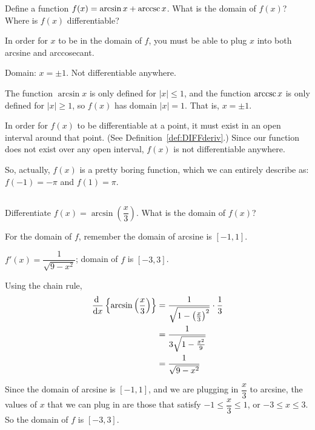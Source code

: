 \begin{question}
Define a function $f(x)=\arcsin x + \mathop{\mathrm{arccsc}} x$. What is the domain of $f(x)$? Where is $f(x)$ differentiable?
\end{question}
\begin{hint}
In order for $x$ to be in the domain of $f$, you must be able to plug $x$ into both arcsine and arccosecant.
\end{hint}
\begin{answer}
Domain: $x=\pm 1$. Not differentiable anywhere.
\end{answer}
\begin{solution}
The function $\arcsin x$ is only defined for $|x| \leq 1$, and the function $\mathop{\mathrm{arccsc}} x$ is only defined for $|x| \geq 1$, so $f(x)$ has domain $|x|=1$. That is, $x=\pm1$.

In order for $f(x)$ to be differentiable at a point, it must exist in an open interval around that point. (See Definition~\ref*{def:DIFFderiv}.) Since our function does not exist over any open interval, $f(x)$ is not differentiable anywhere.

So, actually, $f(x)$ is a pretty boring function, which we can entirely describe as: $f(-1)=-\pi$ and $f(1)=\pi$.
\end{solution}




\subsection*{\Procedural}





\begin{question}
Differentiate $f(x)=\arcsin\left(\dfrac{x}{3}\right)$. What is the domain of $f(x)$?
\end{question}
\begin{hint}
For the domain of $f$, remember the domain of arcsine is $[-1,1]$.
\end{hint}
\begin{answer}
$f'(x)=\dfrac{1}{\sqrt{9-x^2}}$; domain of $f$ is $[-3,3]$.
\end{answer}
\begin{solution}
Using the chain rule,
\begin{align*}
\diff{}{x}\left\{\arcsin\left(\frac{x}{3}\right)\right\}&=\frac{1}{\sqrt{1-\left(\frac{x}{3}\right)^2}}\cdot \frac{1}{3}\\
&=\frac{1}{3\sqrt{1-\frac{x^2}{9}}}\\
&=\frac{1}{\sqrt{9-x^2}}
\end{align*}

Since the domain of arcsine is $[-1,1]$, and we are plugging in $\dfrac{x}{3}$ to arcsine, the values of $x$ that we can plug in are those that satisfy $-1 \le \dfrac{x}{3} \leq 1$, or $-3\leq x \leq 3$. So the domain of $f$ is $[-3,3]$.
\end{solution}


